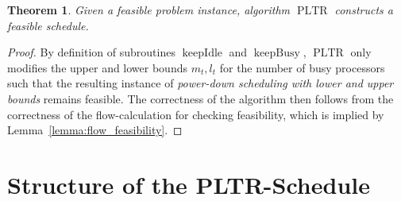 \documentclass[a4paper]{article}
\DeclareMathOperator{\PLTR}{PLTR}
\DeclareMathOperator{\keepidle}{keepIdle}
\DeclareMathOperator{\keepbusy}{keepBusy}
\newtheorem{theorem}{Theorem}
\begin{document}
\begin{theorem}\label{theorem:feasibility}
  Given a feasible problem instance, algorithm $\PLTR$ constructs a feasible schedule.
\end{theorem}
\begin{proof}
  By definition of subroutines $\keepidle$ and $\keepbusy$, $\PLTR$ only modifies the upper and lower bounds $m_t, l_t$ for the number of busy processors such that the resulting instance of \emph{power-down scheduling with lower and upper bounds} remains feasible.
  The correctness of the algorithm then follows from the correctness of the flow-calculation for checking feasibility, which is implied by Lemma~\ref{lemma:flow_feasibility}.
\end{proof}

\section{Structure of the PLTR-Schedule}\label{section:structure}
\end{document}
